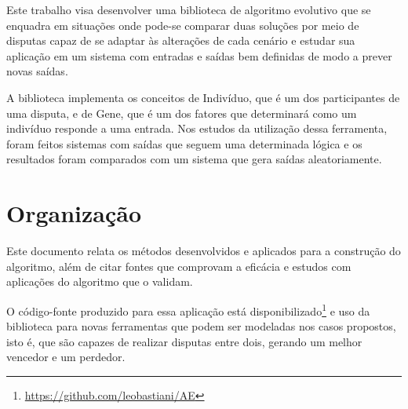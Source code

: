 Este trabalho visa desenvolver uma biblioteca de algoritmo evolutivo que se enquadra em situações onde pode-se comparar duas soluções por meio de disputas capaz de se adaptar às alterações de cada cenário e estudar sua aplicação em um sistema com entradas e saídas bem definidas de modo a prever novas saídas.

A biblioteca implementa os conceitos de Indivíduo, que é um dos participantes de uma disputa, e de Gene, que é um dos fatores que determinará como um indivíduo responde a uma entrada. Nos estudos da utilização dessa ferramenta, foram feitos sistemas com saídas que seguem uma determinada lógica e os resultados foram comparados com um sistema que gera saídas aleatoriamente.

\section{Organização}

Este documento relata os métodos desenvolvidos e aplicados para a construção do algoritmo, além de citar fontes que comprovam a eficácia e estudos com aplicações do algoritmo que o validam.

O código-fonte produzido para essa aplicação está disponibilizado\footnote{\url{https://github.com/leobastiani/AE}} e uso da biblioteca para novas ferramentas que podem ser modeladas nos casos propostos, isto é, que são capazes de realizar disputas entre dois, gerando um melhor vencedor e um perdedor.
